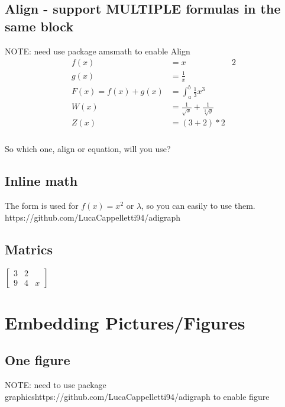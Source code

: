 \documentclass{article}   %
\begin{document}
  \subsection{Align - support MULTIPLE formulas in the same block}
  NOTE: need use package amsmath to enable Align 
  \begin{align*}
    f(x) &= x & 2 \\
    g(x) &= \frac{1}{x} \\
    F(x) = f(x) + g(x) &= \int_{a}^{b} \frac{1}{3}x^3 \\
    W(x) &= \frac{1}{\sqrt{x}} + \frac{1}{\sqrt[3]{y}} \\
    Z(x) &= \left( 3 + 2 \right) * 2
  \end{align*}
  \subsubsection{}
  So which one, align or equation, will you use?


  \subsection{Inline math}
  The form is used for $ f(x) = x^ 2 $ or $\lambda$, so you can easily to use them. 
  https://github.com/LucaCappelletti94/adigraph
  \subsection{Matrics}
  $
  \left[
  \begin{matrix}
    3 & 2 \\
    9 & 4 & x
  \end{matrix}
  \right]
  $

  \newpage


  \section{Embedding Pictures/Figures}

  \subsection{One figure}
  NOTE: need to use package graphicshttps://github.com/LucaCappelletti94/adigraph to enable figure
\end{document}
